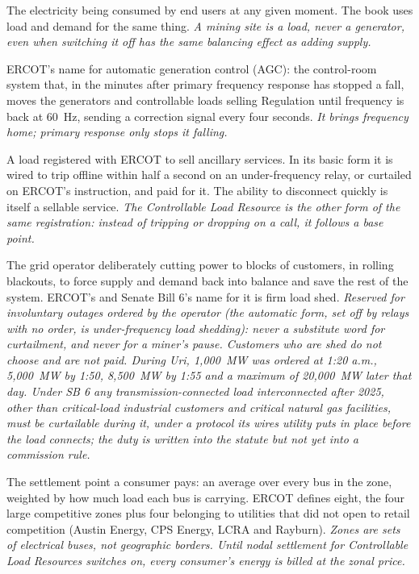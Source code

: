 \begin{description}[leftmargin=0pt,style=unboxed,itemsep=0.35em,parsep=0.15em]
\item[load] \hypertarget{glossary:load}{}The electricity being consumed by end users at any given moment. The book uses load and demand for the same thing. \emph{A mining site is a load, never a generator, even when switching it off has the same balancing effect as adding supply.}
\item[Load Frequency Control (LFC)] \hypertarget{glossary:load-frequency-control}{}ERCOT's name for automatic generation control (AGC): the control-room system that, in the minutes after primary frequency response has stopped a fall, moves the generators and controllable loads selling Regulation until frequency is back at 60~Hz, sending a correction signal every four seconds. \emph{It brings frequency home; primary response only stops it falling.}
\item[load resource] \hypertarget{glossary:load-resource}{}A load registered with ERCOT to sell ancillary services. In its basic form it is wired to trip offline within half a second on an under-frequency relay, or curtailed on ERCOT's instruction, and paid for it. The ability to disconnect quickly is itself a sellable service. \emph{The Controllable Load Resource is the other form of the same registration: instead of tripping or dropping on a call, it follows a base point.}
\item[load shedding (firm load shed)] \hypertarget{glossary:load-shedding}{}The grid operator deliberately cutting power to blocks of customers, in rolling blackouts, to force supply and demand back into balance and save the rest of the system. ERCOT's and Senate Bill 6's name for it is firm load shed. \emph{Reserved for involuntary outages ordered by the operator (the automatic form, set off by relays with no order, is under-frequency load shedding): never a substitute word for curtailment, and never for a miner's pause. Customers who are shed do not choose and are not paid. During Uri, 1,000~MW was ordered at 1:20 a.m., 5,000~MW by 1:50, 8,500~MW by 1:55 and a maximum of 20,000~MW later that day. Under SB 6 any transmission-connected load interconnected after 2025, other than critical-load industrial customers and critical natural gas facilities, must be curtailable during it, under a protocol its wires utility puts in place before the load connects; the duty is written into the statute but not yet into a commission rule.}
\item[load zone] \hypertarget{glossary:load-zone}{}The settlement point a consumer pays: an average over every bus in the zone, weighted by how much load each bus is carrying. ERCOT defines eight, the four large competitive zones plus four belonging to utilities that did not open to retail competition (Austin Energy, CPS Energy, LCRA and Rayburn). \emph{Zones are sets of electrical buses, not geographic borders. Until nodal settlement for Controllable Load Resources switches on, every consumer's energy is billed at the zonal price.}

\end{description}
